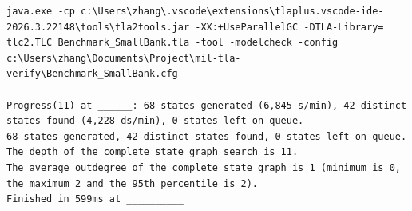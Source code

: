 \documentclass[varwidth]{standalone}
\begin{document}
\begin{verbatim}
java.exe -cp c:\Users\zhang\.vscode\extensions\tlaplus.vscode-ide-2026.3.22148\tools\tla2tools.jar -XX:+UseParallelGC -DTLA-Library= tlc2.TLC Benchmark_SmallBank.tla -tool -modelcheck -config c:\Users\zhang\Documents\Project\mil-tla-verify\Benchmark_SmallBank.cfg

Progress(11) at ______: 68 states generated (6,845 s/min), 42 distinct states found (4,228 ds/min), 0 states left on queue.
68 states generated, 42 distinct states found, 0 states left on queue.
The depth of the complete state graph search is 11.
The average outdegree of the complete state graph is 1 (minimum is 0, the maximum 2 and the 95th percentile is 2).
Finished in 599ms at __________
\end{verbatim}
\end{document}
